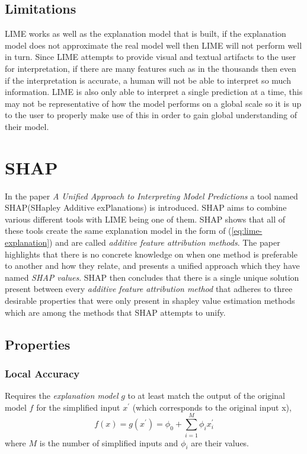 \subsection{Limitations} LIME works as well as the explanation model that is built, if the explanation model does not approximate the real model well then LIME will not perform well in turn. Since LIME attempts to provide visual and textual artifacts to the user for interpretation, if there are many features such as in the thousands then even if the interpretation is accurate, a human will not be able to interpret so much information. LIME is also only able to interpret a single prediction at a time, this may not be representative of how the model performs on a global scale so it is up to the user to properly make use of this in order to gain global understanding of their model.


\section{SHAP}

In the paper \emph{A Unified Approach to Interpreting Model Predictions} a tool named SHAP(SHapley Additive exPlanations) \cite{NIPS2017_7062}  is introduced. SHAP aims to combine various different tools with LIME\cite{lime} being one of them. SHAP shows that all of these tools create the same explanation model in the form of (\ref{eq:lime-explanation}) and are called \emph{additive feature attribution methods}. The paper highlights that there is no concrete knowledge on when one method is preferable to another and how they relate, and presents a unified approach which they have named \emph{SHAP values}. SHAP then concludes that there is a single unique solution present between every \emph{additive feature attribution method} that adheres to three desirable properties that were only present in shapley value estimation methods \cite{articleb} \cite{article} \cite{inproceedings} which are among the methods that SHAP attempts to unify.

\subsection{Properties}

\subsubsection{Local Accuracy}
Requires the \emph{explanation model} $g$ to at least match the output of the original model $f$ for the simplified input $x^{'}$ (which corresponds to the original input x),
\begin{equation}
    f(x) = g(x^{'}) = \phi_{0} + \sum\limits_{i=1}^M \phi_i x_{i}^{'}
    \label{eq:accuracy}
\end{equation}
where $M$ is the number of simplified inputs and $\phi_{i}$ are their values.



